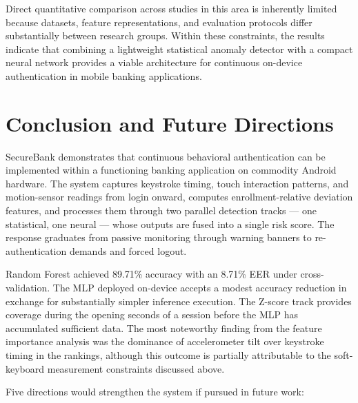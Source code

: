 \documentclass[conference]{IEEEtran}
\begin{document}
Direct quantitative comparison across studies in this area is inherently limited because datasets, feature representations, and evaluation protocols differ substantially between research groups. Within these constraints, the results indicate that combining a lightweight statistical anomaly detector with a compact neural network provides a viable architecture for continuous on-device authentication in mobile banking applications.


\section{Conclusion and Future Directions}
\label{sec:conclusion}

SecureBank demonstrates that continuous behavioral authentication can be implemented within a functioning banking application on commodity Android hardware. The system captures keystroke timing, touch interaction patterns, and motion-sensor readings from login onward, computes enrollment-relative deviation features, and processes them through two parallel detection tracks --- one statistical, one neural --- whose outputs are fused into a single risk score. The response graduates from passive monitoring through warning banners to re-authentication demands and forced logout.

Random Forest achieved 89.71\% accuracy with an 8.71\% EER under cross-validation. The MLP deployed on-device accepts a modest accuracy reduction in exchange for substantially simpler inference execution. The Z-score track provides coverage during the opening seconds of a session before the MLP has accumulated sufficient data. The most noteworthy finding from the feature importance analysis was the dominance of accelerometer tilt over keystroke timing in the rankings, although this outcome is partially attributable to the soft-keyboard measurement constraints discussed above.

Five directions would strengthen the system if pursued in future work:
\end{document}
